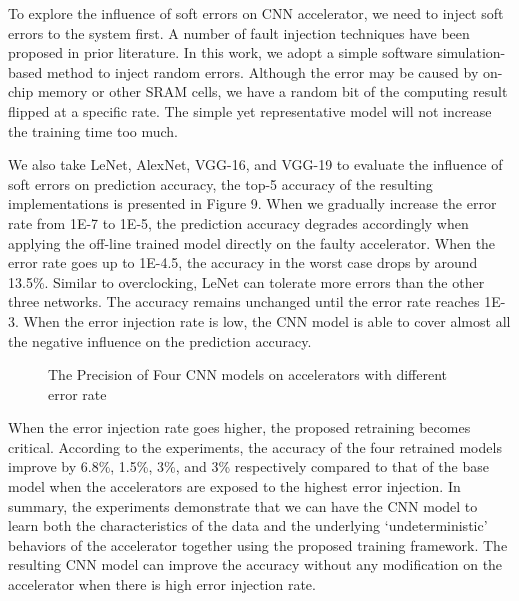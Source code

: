   To explore the influence of soft errors on CNN accelerator, we need to inject soft errors to the system first. 
A number of fault injection techniques have been proposed in prior literature. In this work, we adopt 
a simple software simulation- based method to inject random errors. Although the error may be caused by 
on-chip memory or other SRAM cells, we have a random bit of the computing result flipped at a specific rate. 
The simple yet representative model will not increase the training time too much.

  We also take LeNet, AlexNet, VGG-16, and VGG-19 to evaluate the influence of soft errors on prediction accuracy,
the top-5 accuracy of the resulting implementations is presented in Figure 9. When we gradually 
increase the error rate from 1E-7 to 1E-5, the prediction accuracy degrades accordingly when applying the off-line 
trained model directly on the faulty accelerator. When the error rate goes up to 1E-4.5, 
the accuracy in the worst case drops by around 13.5\%. Similar to overclocking, LeNet can tolerate 
more errors than the other three networks. The accuracy remains unchanged until the error rate reaches 1E-3. 
When the error injection rate is low, the CNN model is able to cover almost all the negative influence 
on the prediction accuracy.

\begin{figure*}
        \center
        \qquad
        \qquad
        \qquad
        \caption{The Precision of Four CNN models on accelerators with different error rate}
        \label{fig:softerror accuracy}
\end{figure*}


  When the error injection rate goes higher, the proposed retraining becomes critical. 
According to the experiments, the accuracy of the four retrained models improve by 6.8\%, 1.5\%, 3\%, and 3\% 
respectively compared to that of the base model when the accelerators are exposed to the highest 
error injection. In summary, the experiments demonstrate that we can have the CNN model to learn 
both the characteristics of the data and the underlying ‘undeterministic’ behaviors of the accelerator 
together using the proposed training framework. The resulting CNN model can improve the accuracy 
without any modification on the accelerator when there is high error injection rate.  

